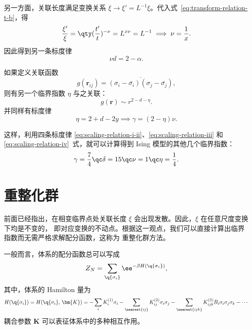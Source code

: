 另一方面，关联长度满足变换关系 $\xi\to\xi'=L^{-1}\xi$。代入式~\eqref{eq:transform-relation-t-b}，得
\begin{equation}
  \frac{\xi'}{\xi} = \qty(\frac{t'}{t})^{-\nu} = L^{x\nu} = L^{-1}
  \implies \nu = \frac{1}{x}.
\end{equation}
因此得到另一条标度律
\begin{equation}
  \label{eq:scaling-relation-iii}
  \nu d = 2 - \alpha.
\end{equation}

如果定义关联函数
\begin{equation}
  g(\bm{r}_{ij}) = \overline{(\sigma_i-\bar{\sigma_i})(\sigma_j-\bar{\sigma_j})},
\end{equation}
则有另一个临界指数 $\eta$ 与之关联：
\begin{equation}
  g(\bm{r}) \sim r^{2-d-\eta}.
\end{equation}
并同样有标度律
\begin{equation}
  \label{eq:scaling-relation-iv}
  \eta = 2 + d - 2y \implies \gamma = (2-\eta) \nu.
\end{equation}

这样，利用四条标度律 \eqref{eq:scaling-relation-i-ii}、\eqref{eq:scaling-relation-iii} 和
\eqref{eq:scaling-relation-iv}~式，就可以计算得到 Ising 模型的其他几个临界指数：
\begin{equation}
  \gamma = \frac{7}{4} \qc
  \delta = 15          \qc
  \nu    = 1           \qc
  \eta   = \frac{1}{4}.
\end{equation}

\section{重整化群}

前面已经指出，在相变临界点处关联长度 $\xi$ 会出现发散。因此，$\xi$ 在任意尺度变换下均是不变的，
即对应变换的不动点。根据这一观点，我们可以直接计算出临界指数而无需严格求解配分函数，这称为
重整化群方法。

一般而言，体系的配分函数总可以写成
\begin{equation}
  Z_N = \sum_\q{\sigma_i} \ee^{-\beta H(\q{\sigma_i})},
\end{equation}
其中，体系的 Hamilton 量为
\begin{equation}
    H(\q{\sigma_i})
  = H(\q{\sigma_i},\,\bm{K})
  = - \sum_i K^{(1)}_i \sigma_i
    - \sum_{\nearest{ij}} K^{(2)}_{ij} \sigma_i\sigma_j
    - \sum_{\nearest{ijk}} K^{(3)}_{ijk} B_i\sigma_i\sigma_j\sigma_k - \cdots
\end{equation}
耦合参数 $\bm{K}$ 可以表征体系中的多种相互作用。

